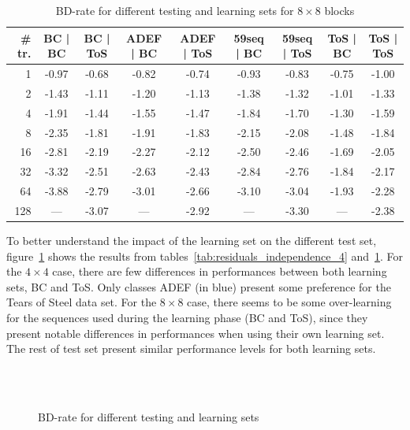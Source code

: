 \documentclass[11pt,a4paper,openright,twoside]{book}
\numberwithin{equation}{section} %
\numberwithin{figure}{section} %
\numberwithin{table}{section} %
\begin{document}
\begin{table}[tb]
	\centering
	\small
	\begin{tabularx}{\linewidth}{r|cc|cc|cc|cc}
		\# tr. & BC | BC & BC | ToS & ADEF | BC & ADEF | ToS & 59seq | BC &
		59seq | ToS & ToS | BC & ToS | ToS \\
		\hline\hline
		1   & -0.97 & -0.68 & -0.82 & -0.74 & -0.93 & -0.83 & -0.75 & -1.00 \\
		2   & -1.43 & -1.11 & -1.20 & -1.13 & -1.38 & -1.32 & -1.01 & -1.33 \\
		4   & -1.91 & -1.44 & -1.55 & -1.47 & -1.84 & -1.70 & -1.30 & -1.59 \\
		8   & -2.35 & -1.81 & -1.91 & -1.83 & -2.15 & -2.08 & -1.48 & -1.84 \\
		16  & -2.81 & -2.19 & -2.27 & -2.12 & -2.50 & -2.46 & -1.69 & -2.05 \\
		32  & -3.32 & -2.51 & -2.63 & -2.43 & -2.84 & -2.76 & -1.84 & -2.17 \\
		64  & -3.88 & -2.79 & -3.01 & -2.66 & -3.10 & -3.04 & -1.93 & -2.28 \\
		128 & ---   & -3.07 & ---   & -2.92 & ---   & -3.30 & ---   & -2.38 \\
	\end{tabularx}
	\caption{\acs{BD}-rate for different testing and learning sets for
	$8\times8$ blocks}
	\label{tab:residuals_independence_8}
\end{table}

To better understand the impact of the learning set on the different test set,
figure~\ref{fig:residuals_independence} shows the results from
tables~\ref{tab:residuals_independence_4}
and~\ref{tab:residuals_independence_8}.
For the $4\times4$ case, there are few differences in performances between
both learning sets, BC and ToS.
Only classes ADEF (in blue) present some preference for the Tears of
Steel data set.
For the $8\times8$ case, there seems to be some over-learning for the
sequences used during the learning phase (BC and ToS), since they present
notable differences in performances when using their own learning set.
The rest of test set present similar performance levels for both learning
sets.

\begin{figure}[tb]
	\centering
	\\
	\\
	\caption{\acs{BD}-rate for different testing and learning sets}
	\label{fig:residuals_independence}
\end{figure}
\end{document}
